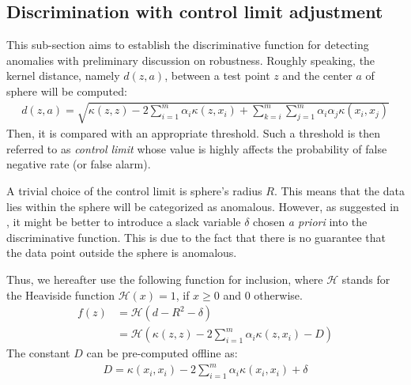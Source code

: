 \documentclass[3p]{elsarticle}
\theoremstyle{problemstyle}
\begin{document}
\subsection{Discrimination with control limit adjustment}

This sub-section aims to establish the discriminative function for detecting anomalies with preliminary discussion on robustness. Roughly speaking, the kernel distance, namely $d \left( z, a \right)$, between a test point $z$ and the center $a$ of sphere will be computed:
\begin{align}
d \left( z, a \right) = \sqrt{\kappa \left( z, z \right) - 2 \sum_{i=1}^m \alpha_i \kappa \left( z, x_i \right) + \sum_{k=i}^m \sum_{j=1}^m \alpha_i \alpha_j \kappa \left( x_i, x_j \right)}
\end{align}
Then, it is compared with an appropriate threshold. Such a threshold is then referred to as \emph{control limit} whose value is highly affects the probability of false negative rate (or false alarm).

A trivial choice of the control limit is sphere's radius $R$. This means that the data lies within the sphere will be categorized as anomalous. However, as suggested in \cite[Section~7.1]{shawe2004kernel}, it might be better to introduce a slack variable $\delta$ chosen \emph{a priori} into the discriminative function. This is due to the fact that there is no guarantee that the data point outside the sphere is anomalous.

Thus, we hereafter use the following function for inclusion, where $\mathcal{H}$ stands for the Heaviside function $\mathcal{H}(x) = 1$, if $x \ge 0$ and $0$ otherwise.
\begin{align}
f \left( z \right) &= \mathcal{H} \left( d - R^2 - \delta \right) \nonumber \\
&= \mathcal{H} \left( \kappa \left( z, z \right) - 2 \sum_{i=1}^m \alpha_i \kappa \left( z, x_i \right) - D \right) \label{eq:decision_fcn}
\end{align}
The constant $D$ can be pre-computed offline as:
\begin{align}
D = \kappa \left( x_i, x_i \right) - 2 \sum_{i=1}^m \alpha_i \kappa \left( x_i, x_i \right) + \delta
\end{align}
\end{document}
